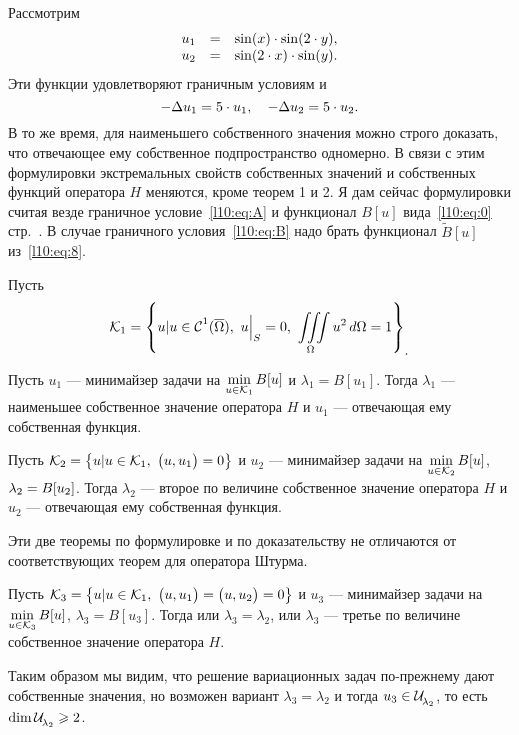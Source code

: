 \noindent Рассмотрим 
\begin{equation*}
	\hfill\begin{array}{rcl}
		u_1&=&\sin(x)\cdot\sin(2\cdot y),\\
		u_2&=&\sin(2\cdot x)\cdot\sin(y).
	\end{array}\hfill
\end{equation*}
Эти функции удовлетворяют граничным условиям и 
\begin{equation*}
	\hfill-\Delta u_1=5\cdot u_1,\quad-\Delta u_2=5\cdot u_2.\hfill
\end{equation*}
В то же время, для наименьшего собственного значения можно строго доказать, что отвечающее ему собственное подпространство одномерно. В связи с этим формулировки экстремальных свойств собственных значений и собственных функций оператора $H$ меняются, кроме теорем 1 и 2. Я дам сейчас формулировки считая везде граничное условие~\eqref{l10:eq:A} и функционал $B[u]$ вида~\eqref{l10:eq:0} стр.~\pageref{l10:eq:0}. В случае граничного условия~\eqref{l10:eq:B} надо брать функционал $\widetilde{B}[u]$ из~\eqref{l10:eq:8}. 

Пусть 
\begin{equation*}
	\hfill\K_1=\left\{u|u\in\Cfn{1}(\overline{\Omega}),\ u\Big|_{S}=0,\ \iiint\limits_{\Omega}u^2\,d\Omega=1\right\}_{\displaystyle.}\hfill
\end{equation*} 
\begin{_teor}
	Пусть $u_1$ --- минимайзер задачи на $\displaystyle\min\limits_{u\in\K_1}B[u]$ и $\lambda_1=B[u_1]$. Тогда $\lambda_1$ --- наименьшее собственное значение оператора $H$ и $u_1$ --- отвечающая ему собственная функция.
\end{_teor}
\begin{_teor}
	Пусть $\K_2=\left\{u|u\in\K_1,\ \big(u,u_1\big)=0\right\}$ и $u_2$ --- минимайзер задачи на $\displaystyle\min\limits_{u\in\K_2}B[u]$, $\lambda_2\?=B[u_2]$. Тогда $\lambda_2$ --- второе по величине собственное значение оператора $H$ и $u_2$ --- отвечающая ему собственная функция.
\end{_teor}
Эти две теоремы по формулировке и по доказательству не отличаются от соответствующих теорем для оператора Штурма.
\begin{_teor}
	Пусть $\K_3=\left\{u|u\in\K_1,\ \big(u,u_1\big)=\big(u,u_2\big)=0\right\}$ и $u_3$ --- минимайзер задачи на $\displaystyle\min\limits_{u\in\K_3}B[u]$, $\lambda_3=B[u_3]$. Тогда или $\lambda_3=\lambda_2$, или $\lambda_3$ --- третье по величине собственное значение оператора $H$. 
\end{_teor}
Таким образом мы видим, что решение вариационных задач по-прежнему дают собственные значения, но возможен вариант $\lambda_3=\lambda_2$ и тогда $u_3\in\Ul[\lambda_2]$, то есть $\dim\Ul[\lambda_2]\geqslant2$.

